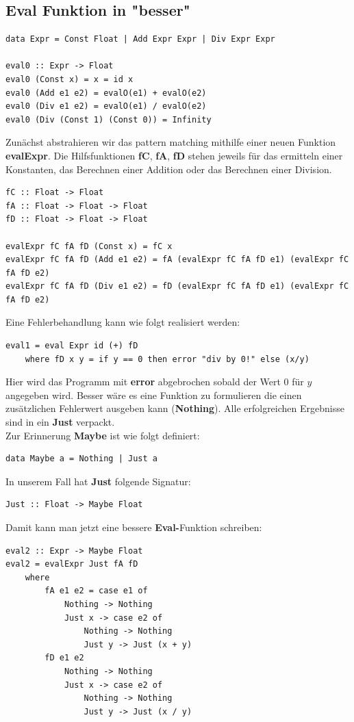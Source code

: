 \documentclass[ngerman,a4paper]{report}
\begin{document}
\subsection{Eval Funktion in "besser"}
\begin{lstlisting}
data Expr = Const Float | Add Expr Expr | Div Expr Expr

eval0 :: Expr -> Float
eval0 (Const x) = x = id x
eval0 (Add e1 e2) = evalO(e1) + evalO(e2)
eval0 (Div e1 e2) = evalO(e1) / evalO(e2)
eval0 (Div (Const 1) (Const 0)) = Infinity
\end{lstlisting}
Zunächst abstrahieren wir das pattern matching mithilfe einer neuen Funktion \textbf{evalExpr}. Die Hilfsfunktionen \textbf{fC}, \textbf{fA}, \textbf{fD} stehen jeweils für das ermitteln einer Konstanten, das Berechnen einer Addition oder das Berechnen einer Division.
\begin{lstlisting}
fC :: Float -> Float
fA :: Float -> Float -> Float
fD :: Float -> Float -> Float

evalExpr fC fA fD (Const x) = fC x
evalExpr fC fA fD (Add e1 e2) = fA (evalExpr fC fA fD e1) (evalExpr fC fA fD e2)
evalExpr fC fA fD (Div e1 e2) = fD (evalExpr fC fA fD e1) (evalExpr fC fA fD e2)
\end{lstlisting}
Eine Fehlerbehandlung kann wie folgt realisiert werden:
\begin{lstlisting}
eval1 = eval Expr id (+) fD
	where fD x y = if y == 0 then error "div by 0!" else (x/y)
\end{lstlisting}
Hier wird das Programm mit \textbf{error} abgebrochen sobald der Wert $0$ für $y$angegeben wird. Besser wäre es eine Funktion zu formulieren die einen zusätzlichen Fehlerwert ausgeben kann (\textbf{Nothing}). Alle erfolgreichen Ergebnisse sind in ein \textbf{Just} verpackt.\\
Zur Erinnerung \textbf{Maybe} ist wie folgt definiert:
\begin{lstlisting}
data Maybe a = Nothing | Just a
\end{lstlisting}
In unserem Fall hat \textbf{Just} folgende Signatur:
\begin{lstlisting}
Just :: Float -> Maybe Float
\end{lstlisting}
Damit kann man jetzt eine bessere \textbf{Eval-}Funktion schreiben:
\begin{lstlisting}
eval2 :: Expr -> Maybe Float
eval2 = evalExpr Just fA fD
	where
		fA e1 e2 = case e1 of
			Nothing -> Nothing
			Just x -> case e2 of
				Nothing -> Nothing
				Just y -> Just (x + y)
		fD e1 e2
			Nothing -> Nothing
			Just x -> case e2 of
				Nothing -> Nothing
				Just y -> Just (x / y)
\end{lstlisting}
\end{document}
